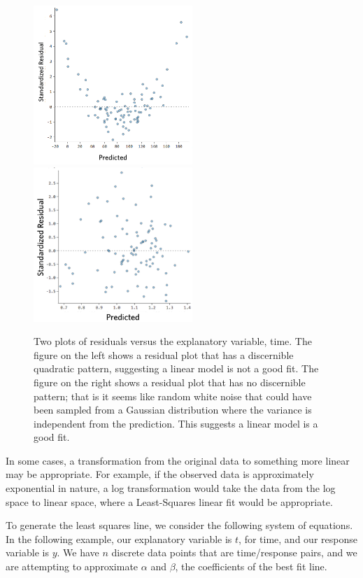 \begin{figure}
\centering
\includegraphics[width=6cm]{body/background/badresid.png}
\includegraphics[width=6cm]{body/background/goodresid.png}
\caption{Two plots of residuals versus the explanatory variable, time. The figure on the left shows a residual plot that has a discernible quadratic pattern, suggesting a linear model is not a good fit. The figure on the right shows a residual plot that has no discernible pattern; that is it seems like random white noise that could have been sampled from a Gaussian distribution where the variance is independent from the prediction. This suggests a linear model is a good fit.}
\label{fig:resids}
\end{figure}


In some cases, a transformation from the original data to something more linear may be appropriate. For example, if the observed data is approximately exponential in nature, a log transformation would take the data from the log space to linear space, where a Least-Squares linear fit would be appropriate.

To generate the least squares line, we consider the following system of equations. In the following example, our explanatory variable is $t$, for time, and our response variable is $y$. We have $n$ discrete data points that are time/response pairs, and we are attempting to approximate $\alpha$ and $\beta$, the coefficients of the best fit line. 

